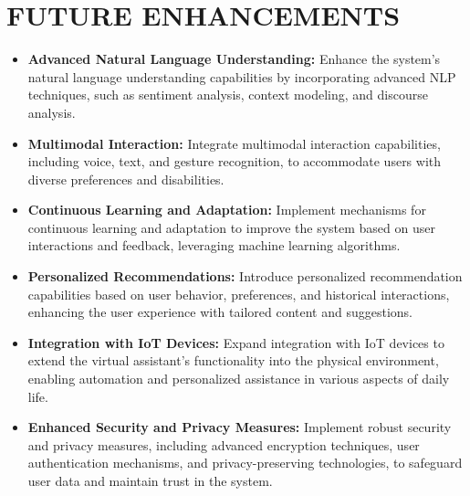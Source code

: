 \documentclass[12pt,a4paper]{report}
\begin{document}
\chapter{FUTURE ENHANCEMENTS}

\begin{itemize}
    \item \textbf{Advanced Natural Language Understanding:} Enhance the system's natural language understanding capabilities by incorporating advanced NLP techniques, such as sentiment analysis, context modeling, and discourse analysis.
    
    \item \textbf{Multimodal Interaction:} Integrate multimodal interaction capabilities, including voice, text, and gesture recognition, to accommodate users with diverse preferences and disabilities.
    
    \item \textbf{Continuous Learning and Adaptation:} Implement mechanisms for continuous learning and adaptation to improve the system based on user interactions and feedback, leveraging machine learning algorithms.
    
    \item \textbf{Personalized Recommendations:} Introduce personalized recommendation capabilities based on user behavior, preferences, and historical interactions, enhancing the user experience with tailored content and suggestions.
    
    \item \textbf{Integration with IoT Devices:} Expand integration with IoT devices to extend the virtual assistant's functionality into the physical environment, enabling automation and personalized assistance in various aspects of daily life.
    
    \item \textbf{Enhanced Security and Privacy Measures:} Implement robust security and privacy measures, including advanced encryption techniques, user authentication mechanisms, and privacy-preserving technologies, to safeguard user data and maintain trust in the system.
\end{itemize}


\newpage
\end{document}
